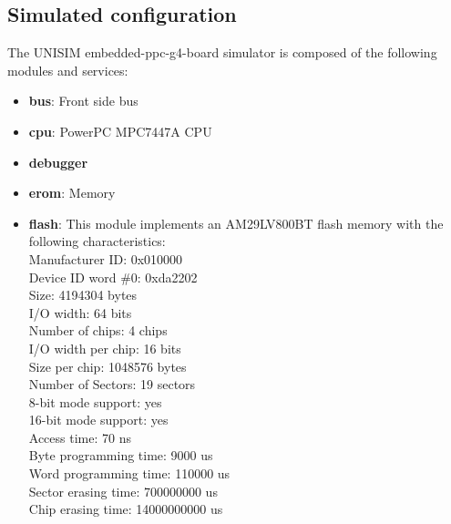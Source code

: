 \subsection{Simulated configuration}
\label{UNISIM embedded-ppc-g4-board_simulated_configuration}
\noindent The UNISIM embedded-ppc-g4-board simulator is composed of the following modules and services:
\begin{itemize}\addtolength{\itemsep}{-0.40\baselineskip}
\item \textbf{bus}: Front side bus
\item \textbf{cpu}: PowerPC MPC7447A CPU
\item \textbf{debugger}
\item \textbf{erom}: Memory
\item \textbf{flash}: This module implements an AM29LV800BT flash memory with the following characteristics:\\
Manufacturer ID: 0x010000\\
Device ID word \#0: 0xda2202\\
Size: 4194304 bytes\\
I/O width: 64 bits\\
Number of chips: 4 chips\\
I/O width per chip: 16 bits\\
Size per chip: 1048576 bytes\\
Number of Sectors: 19 sectors\\
8-bit mode support: yes\\
16-bit mode support: yes\\
Access time: 70 ns\\
Byte programming time: 9000 us\\
Word programming time: 110000 us\\
Sector erasing time: 700000000 us\\
Chip erasing time: 14000000000 us\\


\end{itemize}
